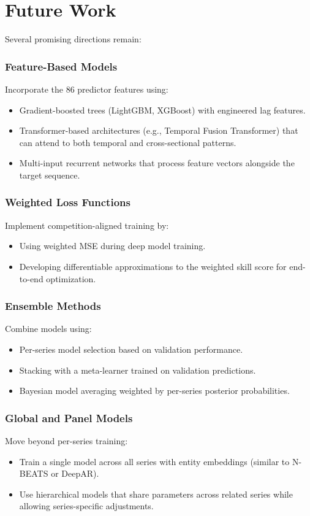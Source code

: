 \section{Future Work}
\label{sec:future_work}

Several promising directions remain:

\subsubsection{Feature-Based Models}
Incorporate the 86 predictor features using:
\begin{itemize}
    \item Gradient-boosted trees (LightGBM, XGBoost) with engineered lag features.
    \item Transformer-based architectures (e.g., Temporal Fusion Transformer) that can attend to both temporal and cross-sectional patterns.
    \item Multi-input recurrent networks that process feature vectors alongside the target sequence.
\end{itemize}

\subsubsection{Weighted Loss Functions}
Implement competition-aligned training by:
\begin{itemize}
    \item Using weighted MSE during deep model training.
    \item Developing differentiable approximations to the weighted skill score for end-to-end optimization.
\end{itemize}

\subsubsection{Ensemble Methods}
Combine models using:
\begin{itemize}
    \item Per-series model selection based on validation performance.
    \item Stacking with a meta-learner trained on validation predictions.
    \item Bayesian model averaging weighted by per-series posterior probabilities.
\end{itemize}

\subsubsection{Global and Panel Models}
Move beyond per-series training:
\begin{itemize}
    \item Train a single model across all series with entity embeddings (similar to N-BEATS or DeepAR).
    \item Use hierarchical models that share parameters across related series while allowing series-specific adjustments.
\end{itemize}

